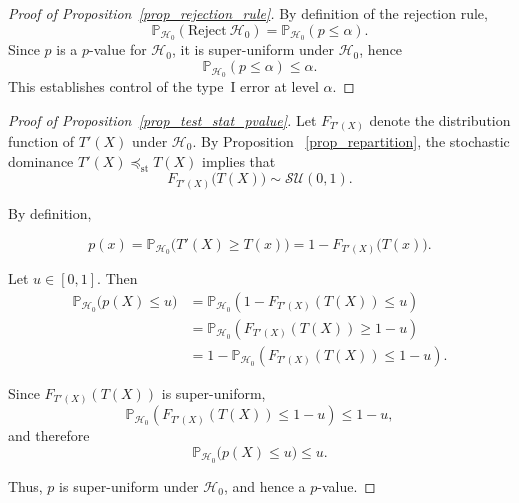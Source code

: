 \documentclass[a4paper,11pt]{article}
\theoremstyle{plain}
\newcommand{\1}{\mathbf{1}}
\begin{document}
\begin{proof}[Proof of Proposition~\ref{prop_rejection_rule}]

By definition of the rejection rule,
\begin{equation}
  \mathbb{P}_{\mathcal{H}_0}(\text{Reject} ~ \mathcal{H}_0)
= \mathbb{P}_{\mathcal{H}_0}(p \le \alpha).
\end{equation}
Since \(p\) is a $p$-value for \(\mathcal{H}_0\), it is super-uniform under
\(\mathcal{H}_0\), hence
\begin{equation}
\mathbb{P}_{\mathcal{H}_0}(p \le \alpha) \le \alpha.
\end{equation}
This establishes control of the type~I error at level \(\alpha\).
\end{proof}





\begin{proof}[Proof of Proposition~\ref{prop_test_stat_pvalue}]

Let \(F_{T'(X)}\) denote the distribution
function of \(T'(X)\) under $\mathcal{H}_0$.
By Proposition ~\ref{prop_repartition}, the stochastic dominance
\(T'(X) \preceq_{\mathrm{st}} T(X)\) implies that
\[
F_{T'(X)}\bigl(T(X)\bigr) \sim \mathcal{SU}(0,1).
\]

By definition,

\begin{equation}
p(x)
= \mathbb{P}_{\mathcal{H}_0}\!\bigl(T'(X) \ge T(x)\bigr)
= 1 - F_{T'(X)}\bigl(T(x)\bigr).
\end{equation}

Let \(u \in [0,1]\). Then
\begin{align}
\mathbb{P}_{\mathcal{H}_0}\bigl(p(X) \le u\bigr)
&= \mathbb{P}_{\mathcal{H}_0}\!\left(1 - F_{T'(X)}(T(X)) \le u\right) \\
&= \mathbb{P}_{\mathcal{H}_0}\!\left(F_{T'(X)}(T(X)) \ge 1-u\right) \\
&= 1 - \mathbb{P}_{\mathcal{H}_0}\!\left(F_{T'(X)}(T(X)) \le 1-u\right).
\end{align}

Since \(F_{T'(X)}(T(X))\) is super-uniform,
\begin{equation}
\mathbb{P}_{\mathcal{H}_0}\!\left(F_{T'(X)}(T(X)) \le 1-u\right) \le 1-u,
\end{equation}
and therefore
\begin{equation}
\mathbb{P}_{\mathcal{H}_0}\bigl(p(X) \le u\bigr) \le u.
\end{equation}

Thus, \(p\) is super-uniform under \(\mathcal{H}_0\), and hence a $p$-value.
\end{proof}
\end{document}
